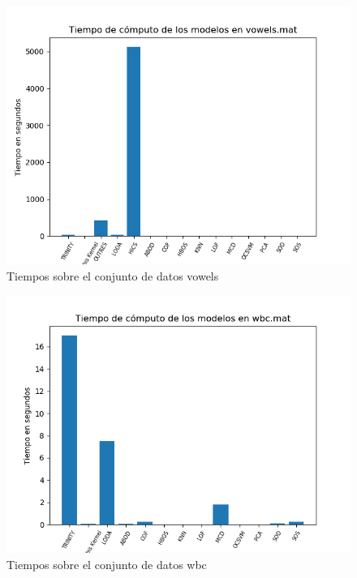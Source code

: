 \begin{figure}[H]
	\centering
	\label{vowels_times}
	\includegraphics[scale=0.7]{imagenes/imgs-exp1/times/vowels}
	\caption{Tiempos sobre el conjunto de datos vowels}
\end{figure}

\begin{figure}[H]
	\centering
	\label{wbc_times}
	\includegraphics[scale=0.7]{imagenes/imgs-exp1/times/wbc}
	\caption{Tiempos sobre el conjunto de datos wbc}
\end{figure}

